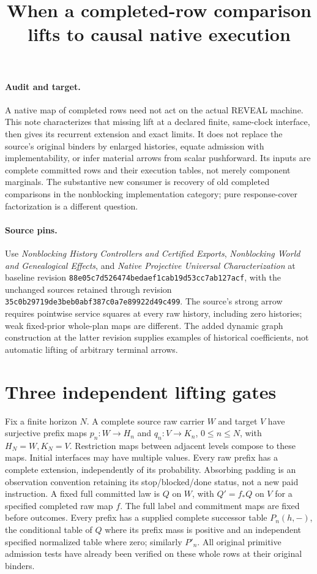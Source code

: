 \documentclass{article}
\title{When a completed-row comparison lifts to causal native execution}
\author{}\date{}
\begin{document}
\maketitle
\paragraph{Audit and target.}
A native map of completed rows need not act on the actual REVEAL machine. This note characterizes that missing lift at a declared finite, same-clock interface, then gives its recurrent extension and exact limits. It does not replace the source's original binders by enlarged histories, equate admission with implementability, or infer material arrows from scalar pushforward. Its inputs are complete committed rows and their execution tables, not merely component marginals. The substantive new consumer is recovery of old completed comparisons in the nonblocking implementation category; pure response-cover factorization is a different question.

\paragraph{Source pins.}
Use \emph{Nonblocking History Controllers and Certified Exports}, \emph{Nonblocking World and Genealogical Effects}, and \emph{Native Projective Universal Characterization} at baseline revision \texttt{88e05c7d526474bedaef1cab19d53cc7ab127acf}, with the unchanged sources retained through revision \texttt{35c0b29719de3beb0abf387c0a7e89922d49c499}. The source's strong arrow requires pointwise service squares at every raw history, including zero histories; weak fixed-prior whole-plan maps are different. The added dynamic graph construction at the latter revision supplies examples of historical coefficients, not automatic lifting of arbitrary terminal arrows.

\section{Three independent lifting gates}
Fix a finite horizon $N$. A complete source raw carrier $W$ and target $V$ have surjective prefix maps $p_n:W\to H_n$ and $q_n:V\to K_n$, $0\le n\le N$, with $H_N=W,K_N=V$. Restriction maps between adjacent levels compose to these maps. Initial interfaces may have multiple values. Every raw prefix has a complete extension, independently of its probability. Absorbing padding is an observation convention retaining its stop/blocked/done status, not a new paid instruction. A fixed full committed law is $Q$ on $W$, with $Q'=f_*Q$ on $V$ for a specified completed raw map $f$. The full label and commitment maps are fixed before outcomes. Every prefix has a supplied complete successor table $P_n(h,-)$, the conditional table of $Q$ where its prefix mass is positive and an independent specified normalized table where zero; similarly $P'_n$. All original primitive admission tests have already been verified on these whole rows at their original binders.
\end{document}
